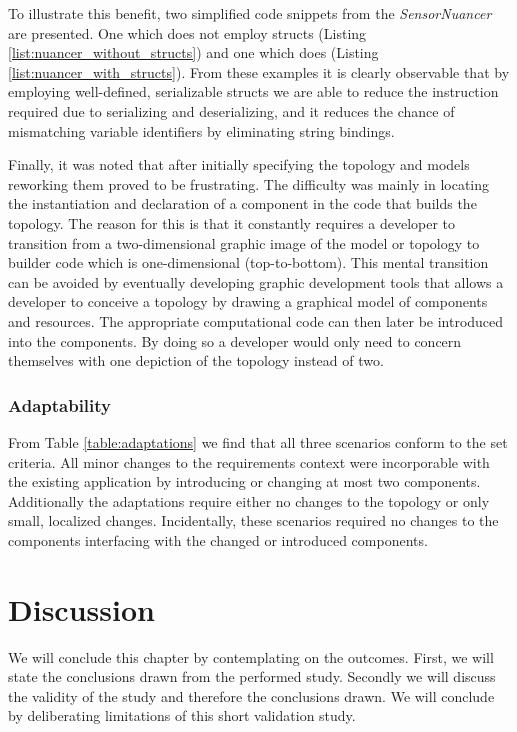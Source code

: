 To illustrate this benefit, two simplified code snippets from the \emph{SensorNuancer} are presented. One which does not employ structs (Listing \ref{list:nuancer_without_structs}) and one which does (Listing \ref{list:nuancer_with_structs}). From these examples it is clearly observable that by employing well-defined, serializable structs we are able to reduce the instruction required due to serializing and deserializing, and it reduces the chance of mismatching variable identifiers by eliminating string bindings.



Finally, it was noted that after initially specifying the topology and models reworking them proved to be frustrating. The difficulty was mainly in locating the instantiation and declaration of a component in the code that builds the topology. The reason for this is that it constantly requires a developer to transition from a two-dimensional graphic image of the model or topology to builder code which is one-dimensional (top-to-bottom). This mental transition can be avoided by eventually developing  graphic development tools that allows a developer to conceive a topology by drawing a graphical model of components and resources. The appropriate computational code can then later be introduced into the components. By doing so a developer would only need to concern themselves with one depiction of the topology instead of two.

\subsubsection{Adaptability}
From Table \ref{table:adaptations} we find that all three scenarios conform to the set criteria. All minor changes to the requirements context were incorporable with the existing application by introducing or changing at most two components. Additionally the adaptations require either no changes to the topology or only small, localized changes. Incidentally, these scenarios required no changes to the components interfacing with the changed or introduced components.

\section{Discussion}
We will conclude this chapter by contemplating on the outcomes. First, we will state the conclusions drawn from the performed study. Secondly we will discuss the validity of the study and therefore the conclusions drawn. We will conclude by deliberating limitations of this short validation study.
